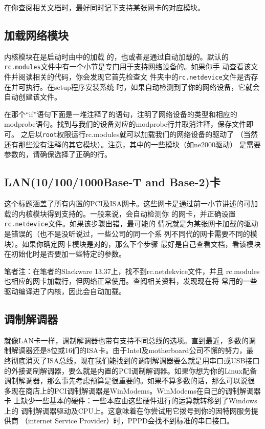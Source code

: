在你查阅相关文档时，最好同时记下支持某张网卡的对应模块。

\subsection{加载网络模块}
\label{sec:networkConfiguration:hardware:loadingModules}
内核模块在是启动时由中的加载
的，也或者是通过自动加载的。默认的
\texttt{rc.modules}文件中有一个小节是专门用于支持网络设备的。如果你手
动查看该文件并阅读相关的代码，你会发现它首先检查文
件夹中的\texttt{rc.netdevice}文件是否存在并可执行。在setup程序安装系统
时，如果自动检测到了你的网络设备，它就会自动创建该文件。

在那个``if''语句下面是一堆注释了的语句，注明了网络设备的类型和相应的
modprobe语句。找到与我们的设备对应的modprobe行并取消注释，保存文件即可。
之后以\texttt{root}权限运行rc.modules就可以加载我们的网络设备的驱动了
（当然还有那些没有注释的其它模块）。注意，其中的一些模块（如ne2000驱动）
是需要参数的，请确保选择了正确的行。

\subsection{LAN(10/100/1000Base-T and Base-2)卡}
\label{sec:networkConfiguration:hardware:lan}
这个标题涵盖了所有内置的PCI及ISA网卡。这些网卡是通过前一小节讲述的可加
载的内核模块得到支持的。一般来说，会自动检测你
的网卡，并正确设置\texttt{rc.netdevice}文件。如果该步骤出错，最可能的
情况就是为某张网卡加载的驱动是错误的（也不是没听说过，一些公司的同一个系
列不同代的网卡需要不同的模块）。如果你确定网卡模块是对的，那么下个步骤
最好是自己查看文档，看该模块在初始化时是否要加一些特定的参数。

笔者注：在笔者的Slackware 13.37上，找不到rc.netdekvice文件，并且
rc.modules也相应的网卡加载行，但网络正常使用。查阅相关资料，发现现在将
常用的一些驱动编译进了内核，因此会自动加载。

\subsection{调制解调器}
\label{sec:networkConfiguration:hardware:modems}
就像LAN卡一样，调制解调器也带有支持不同总线的选项。直到最近，多数的调
制解调器还是8位或16们的ISA卡。由于Intel及motherboard公司不懈的努力，最
终彻底消灭了ISA总线，现在我们能找到的调制解调器要么就是用串口或USB接口
的外接调制解调器，要么就是内置的PCI调制解调器。如果你想为你的Linux配备
调制解调器，那么事先考虑预算是很重要的。如果不算多数的话，那么可以说很
多现在商店上的PCI调制解调器是WinModems。WinModems在自己的调制解调器卡
上缺少一些基本的硬件：一些本应由这些硬件进行的运算就转移到了Windows上的
调制解调器驱动及CPU上。这意味着在你尝试用它拨号到你的因特网服务提供商
（internet Service Provider）时，PPPD会找不到标准的串口接口。

